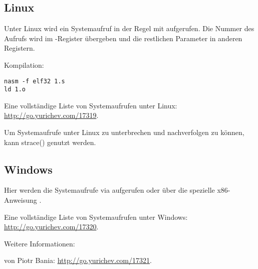 \subsection{Linux}
\label{linux_syscall}

Unter Linux wird ein Systemaufruf in der Regel mit  aufgerufen.
Die Nummer des Aufrufs wird im \EAX-Register übergeben und die restlichen Parameter in anderen Registern.

%


Kompilation:

\begin{lstlisting}
nasm -f elf32 1.s
ld 1.o
\end{lstlisting}

Eine vollständige Liste von Systemaufrufen unter Linux: \url{http://go.yurichev.com/17319}.

Um Systemaufrufe unter Linux zu unterbrechen und nachverfolgen zu können, kann strace()
genutzt werden.

\subsection{Windows}


Hier werden die Systemaufrufe via  aufgerufen oder über die spezielle x86-Anweisung .

Eine vollständige Liste von Systemaufrufen unter Windows: \url{http://go.yurichev.com/17320}.

Weitere Informationen:

 von Piotr Bania: \url{http://go.yurichev.com/17321}.
